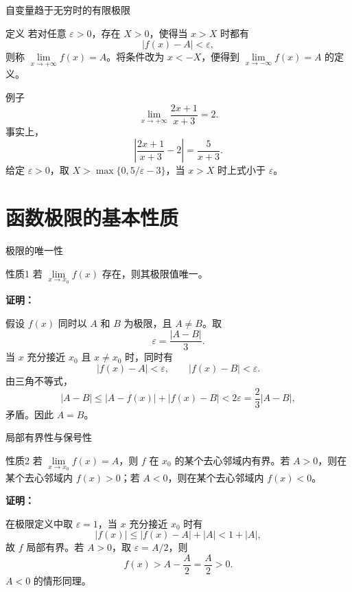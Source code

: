 \documentclass[aspectratio=169,10pt]{ctexbeamer}
\begin{document}
\begin{frame}{自变量趋于无穷时的有限极限}
	\small	
	\begin{block}{定义}
		若对任意 \(\varepsilon>0\)，存在 \(X>0\)，使得当 \(x>X\) 时都有
		\[
		|f(x)-A|<\varepsilon,
		\]
		则称 \(\lim\limits_{x\to+\infty}f(x)=A\)。将条件改为 \(x<-X\)，便得到 \(\lim\limits_{x\to-\infty}f(x)=A\) 的定义。
	\end{block}
	\pause
	
	\begin{block}{例子}
		\[
		\lim\limits_{x\to+\infty}\frac{2x+1}{x+3}=2.
		\]
		事实上，
		\[
		\left|\frac{2x+1}{x+3}-2\right|=\frac5{x+3}.
		\]
		给定 \(\varepsilon>0\)，取 \(X>\max\{0,5/\varepsilon-3\}\)，当 \(x>X\) 时上式小于 \(\varepsilon\)。
	\end{block}
\end{frame}




\section{函数极限的基本性质}


\begin{frame}{极限的唯一性}
	\begin{block}{性质1}
		若 \(\lim\limits_{x\to x_0}f(x)\) 存在，则其极限值唯一。
	\end{block}
	
	\textbf{证明：}
	
	假设 \(f(x)\) 同时以 \(A\) 和 \(B\) 为极限，且 \(A\neq B\)。取
	\[
	\varepsilon=\frac{|A-B|}{3}.
	\]
	当 \(x\) 充分接近 \(x_0\) 且 \(x\neq x_0\) 时，同时有
	\[
	|f(x)-A|<\varepsilon,\qquad |f(x)-B|<\varepsilon.
	\]
	由三角不等式，
	\[
	|A-B|\leq |A-f(x)|+|f(x)-B|<2\varepsilon=\frac23|A-B|,
	\]
	矛盾。因此 \(A=B\)。
	
	
\end{frame}

\begin{frame}{局部有界性与保号性}
	\begin{block}{性质2}
		若 \(\lim\limits_{x\to x_0}f(x)=A\)，则 \(f\) 在 \(x_0\) 的某个去心邻域内有界。若 \(A>0\)，则在某个去心邻域内 \(f(x)>0\)；若 \(A<0\)，则在某个去心邻域内 \(f(x)<0\)。
	\end{block}
	
	\textbf{证明：}
	
	在极限定义中取 \(\varepsilon=1\)，当 \(x\) 充分接近 \(x_0\) 时有
	\[
	|f(x)|\leq |f(x)-A|+|A|<1+|A|,
	\]
	故 \(f\) 局部有界。若 \(A>0\)，取 \(\varepsilon=A/2\)，则
	\[
	f(x)>A-\frac A2=\frac A2>0.
	\]
	\(A<0\) 的情形同理。
\end{frame}
\end{document}
